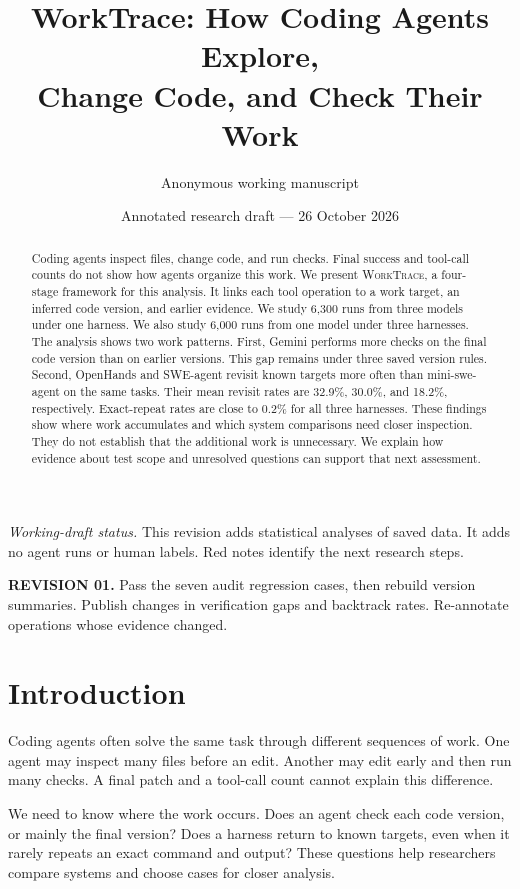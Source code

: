 \documentclass[10pt,a4paper,twocolumn]{article}
\title{\textbf{WorkTrace: How Coding Agents Explore,\\Change Code, and Check Their Work}}
\author{Anonymous working manuscript}
\date{Annotated research draft --- 26 October 2026}
\newcommand{\rev}[2]{\par\smallskip\noindent\begin{minipage}{\linewidth}\color{revision}\footnotesize\textbf{REVISION #1.} #2\end{minipage}\par\smallskip}
\newcommand{\wt}{\textsc{WorkTrace}}
\begin{document}
\maketitle
\begin{abstract}
Coding agents inspect files, change code, and run checks. Final success and tool-call counts do not show how agents organize this work. We present \wt, a four-stage framework for this analysis. It links each tool operation to a work target, an inferred code version, and earlier evidence. We study 6,300 runs from three models under one harness. We also study 6,000 runs from one model under three harnesses. The analysis shows two work patterns. First, Gemini performs more checks on the final code version than on earlier versions. This gap remains under three saved version rules. Second, OpenHands and SWE-agent revisit known targets more often than mini-swe-agent on the same tasks. Their mean revisit rates are 32.9\%, 30.0\%, and 18.2\%, respectively. Exact-repeat rates are close to 0.2\% for all three harnesses. These findings show where work accumulates and which system comparisons need closer inspection. They do not establish that the additional work is unnecessary. We explain how evidence about test scope and unresolved questions can support that next assessment.
\end{abstract}\par\medskip
\noindent\textit{Working-draft status.} This revision adds statistical analyses of saved data. It adds no agent runs or human labels. Red notes identify the next research steps.
\rev{01}{Pass the seven audit regression cases, then rebuild version summaries. Publish changes in verification gaps and backtrack rates. Re-annotate operations whose evidence changed.}

\section{Introduction}
Coding agents often solve the same task through different sequences of work. One agent may inspect many files before an edit. Another may edit early and then run many checks. A final patch and a tool-call count cannot explain this difference.

We need to know where the work occurs. Does an agent check each code version, or mainly the final version? Does a harness return to known targets, even when it rarely repeats an exact command and output? These questions help researchers compare systems and choose cases for closer analysis.
\end{document}
